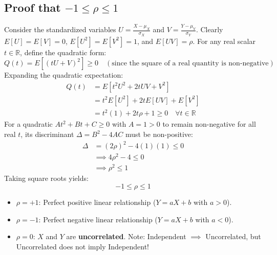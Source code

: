 \documentclass[12pt,a4paper]{article}
\begin{document}
\subsection{Proof that \texorpdfstring{$-1 \le \rho \le 1$}{-1 <= rho <= 1}}
\begin{tcolorbox}[examplebox, title={\textbf{Rigorous Derivation: Cauchy-Schwarz Bound on Correlation}}]
Consider the standardized variables $U = \frac{X - \mu_X}{\sigma_X}$ and $V = \frac{Y - \mu_Y}{\sigma_Y}$. Clearly $E[U] = E[V] = 0$, $E[U^2] = E[V^2] = 1$, and $E[UV] = \rho$.
For any real scalar $t \in \mathbb{R}$, define the quadratic form:
\begin{equation}
  Q(t) = E\left[(t U + V)^2\right] \ge 0 \quad (\text{since the square of a real quantity is non-negative})
\end{equation}
Expanding the quadratic expectation:
\begin{align}
  Q(t) &= E\left[t^2 U^2 + 2t UV + V^2\right] \nonumber \\
       &= t^2 E[U^2] + 2t E[UV] + E[V^2] \nonumber \\
       &= t^2 (1) + 2t \rho + 1 \ge 0 \quad \forall t \in \mathbb{R}
\end{align}
For a quadratic $A t^2 + B t + C \ge 0$ with $A = 1 > 0$ to remain non-negative for all real $t$, its discriminant $\Delta = B^2 - 4AC$ must be non-positive:
\begin{equation}
  \begin{aligned}
    \Delta &= (2\rho)^2 - 4(1)(1) \le 0 \\[3pt]
    &\implies 4\rho^2 - 4 \le 0 \\[3pt]
    &\implies \rho^2 \le 1
  \end{aligned}
\end{equation}
Taking square roots yields:
\begin{equation}
  -1 \le \rho \le 1
\end{equation}
\begin{itemize}[leftmargin=*, itemsep=1pt]
  \item $\rho = +1$: Perfect positive linear relationship ($Y = aX + b$ with $a > 0$).
  \item $\rho = -1$: Perfect negative linear relationship ($Y = aX + b$ with $a < 0$).
  \item $\rho = 0$: $X$ and $Y$ are \textbf{uncorrelated}. Note: Independent $\implies$ Uncorrelated, but Uncorrelated does not imply Independent!
\end{itemize}
\end{tcolorbox}
\end{document}
